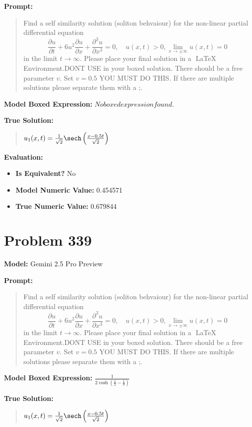 \documentclass{article}
\begin{document}
{\textbf{Prompt:}
\begin{quote}
Find a self similarity solution (soliton behvaiour) for the non-linear partial differential equation $$ \frac{\partial u}{\partial t} + 6 u^2 \frac{\partial u}{\partial x} + \frac{\partial^3 u}{\partial x^3} = 0, \quad u(x, t) > 0, \lim_{x \to \pm \infty} u(x,t) = 0 $$ in the limit $t \rightarrow \infty $. Please place your final solution in a $\boxed{}$ LaTeX Environment.DONT USE \operatorname in your boxed solution. There should be a free parameter $v$. Set $v=0.5$ YOU MUST DO THIS. If there are multiple solutions please separate them with a ;.
\end{quote}
\textbf{Model Boxed Expression:} $No boxed expression found.$

\textbf{True Solution:}
\begin{quote}
$u_1(x, t) = \frac{1}{\sqrt{2}} \sech\left(\frac{x - 0.5t}{\sqrt{2}}\right)$
\end{quote}

\textbf{Evaluation:}
\begin{itemize}
\item \textbf{Is Equivalent?} No
\item \textbf{Model Numeric Value:} 0.454571
\item \textbf{True Numeric Value:} 0.679844
\end{itemize}
\vspace{1cm}
\section*{Problem 339}
\textbf{Model:} Gemini 2.5 Pro Preview

\textbf{Prompt:}
\begin{quote}
Find a self similarity solution (soliton behvaiour) for the non-linear partial differential equation $$ \frac{\partial u}{\partial t} + 6 u^2 \frac{\partial u}{\partial x} + \frac{\partial^3 u}{\partial x^3} = 0, \quad u(x, t) > 0, \lim_{x \to \pm \infty} u(x,t) = 0 $$ in the limit $t \rightarrow \infty $. Please place your final solution in a $\boxed{}$ LaTeX Environment.DONT USE \operatorname in your boxed solution. There should be a free parameter $v$. Set $v=0.5$ YOU MUST DO THIS. If there are multiple solutions please separate them with a ;.
\end{quote}
\textbf{Model Boxed Expression:} $\frac{1}{2\cosh\left(\frac{x}{2} - \frac{t}{8}\right)}$

\textbf{True Solution:}
\begin{quote}
$u_1(x, t) = \frac{1}{\sqrt{2}} \sech\left(\frac{x - 0.5t}{\sqrt{2}}\right)$
\end{quote}

}
\end{document}
